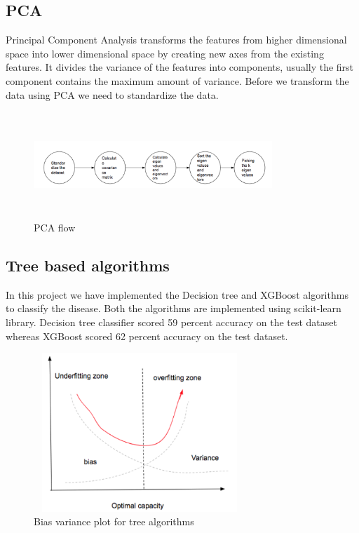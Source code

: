 \documentclass[conference]{IEEEtran}
\begin{document}
\subsection{PCA}
Principal Component Analysis transforms the features from higher dimensional space into lower dimensional space by creating new axes from the existing features. It divides the variance of the features into components, usually the first component contains the maximum amount of variance. Before we transform the data using PCA we need to standardize the data.

  \begin{figure}[!h]
     \centering
     \includegraphics[height=4cm,width=9cm]{pca.png}
    \caption{PCA flow}
    \label{fig:8}
 \end{figure}



\subsection{Tree based algorithms}
In this project we have implemented the Decision tree and XGBoost algorithms to classify the disease. Both the algorithms are implemented using scikit-learn library. Decision tree classifier scored 59 percent accuracy on the test dataset whereas XGBoost scored 62 percent accuracy on the test dataset.


  \begin{figure}[!h]
     \centering
     \includegraphics[height=6cm,width=8cm]{bias.png}
    \caption{Bias variance plot for tree algorithms}
    \label{fig:8}
 \end{figure}
\end{document}
